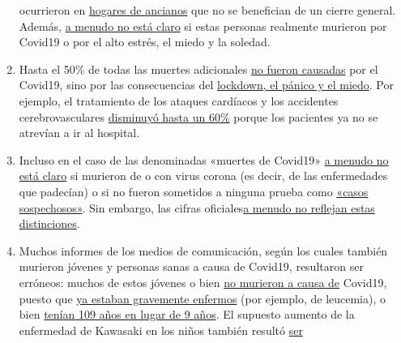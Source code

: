 \begin{enumerate}
  ocurrieron en
  \href{https://swprs.org/studies-on-covid-19-lethality/\#care-homes}{hogares
  de ancianos} que no se benefician de un cierre general. Además,
  \href{https://www.hsj.co.uk/commissioning/thousands-of-extra-deaths-outside-hospital-not-attributed-to-covid-19/7027459.article}{a
  menudo no está claro} si estas personas realmente murieron por Covid19
  o por el alto estrés, el miedo y la soledad.
\item
  Hasta el 50\% de todas las muertes adicionales
  \href{https://www.thetimes.co.uk/edition/news/coronavirus-record-weekly-death-toll-as-fearful-patients-avoid-hospitals-bm73s2tw3}{no
  fueron causadas} por el Covid19, sino por las consecuencias del
  \href{https://www.telegraph.co.uk/global-health/science-and-disease/two-new-waves-deaths-break-nhs-new-analysis-warns/}{lockdown,
  el pánico y el miedo}. Por ejemplo, el tratamiento de los ataques
  cardíacos y los accidentes cerebrovasculares
  \href{https://www.nytimes.com/2020/04/06/well/live/coronavirus-doctors-hospitals-emergency-care-heart-attack-stroke.html}{disminuyó
  hasta un 60\%} porque los pacientes ya no se atrevían a ir al
  hospital.
\item
  Incluso en el caso de las denominadas «muertes de Covid19»
  \href{https://spectator.us/understand-report-figures-covid-deaths/}{a
  menudo no está claro} si murieron de o con virus corona (es decir, de
  las enfermedades que padecían) o si no fueron sometidos a ninguna
  prueba como \href{https://www.youtube.com/watch?v=V0lIWZpiRU0}{«casos
  sospechosos»}. Sin embargo, las cifras
  oficiales\href{https://www.hsj.co.uk/coronavirus/systematic-reviews-to-discover-true-cause-of-outbreak-deaths/7027491.article}{a
  menudo no reflejan estas distinciones}.
\item
  Muchos informes de los medios de comunicación, según los cuales
  también murieron jóvenes y personas sanas a causa de Covid19,
  resultaron ser erróneos: muchos de estos jóvenes o bien
  \href{https://www.dailymail.co.uk/news/article-8193487/Coroner-refuses-rule-COVID-19-cause-death-six-week-old-Connecticut-baby.html}{no
  murieron a causa de} Covid19, puesto que
  \href{https://sports.yahoo.com/spanish-football-coach-francisco-garcia-163153573.html}{ya
  estaban gravemente enfermos} (por ejemplo, de leucemia), o bien
  \href{https://www.n-tv.de/panorama/Neunjaehrige-Corona-Tote-war-109-Jahre-alt-article21753784.html}{tenían
  109 años en lugar de 9 años}. El supuesto aumento de la enfermedad de
  Kawasaki en los niños también resultó
  \href{https://www.societi.org.uk/kawasaki-disease-and-covid-19/}{ser
}
\end{enumerate}
